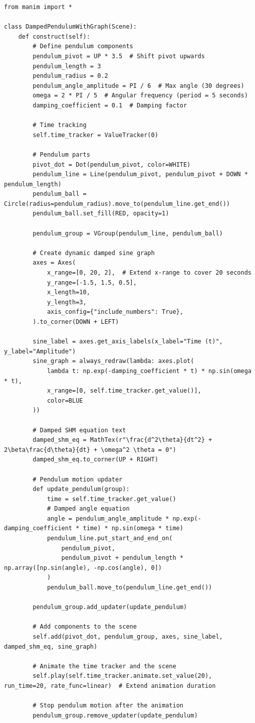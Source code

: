 \documentclass[12pt,a4paper]{article}
\begin{document}
\begin{verbatim}  
from manim import *

class DampedPendulumWithGraph(Scene):
    def construct(self):
        # Define pendulum components
        pendulum_pivot = UP * 3.5  # Shift pivot upwards
        pendulum_length = 3
        pendulum_radius = 0.2
        pendulum_angle_amplitude = PI / 6  # Max angle (30 degrees)
        omega = 2 * PI / 5  # Angular frequency (period = 5 seconds)
        damping_coefficient = 0.1  # Damping factor

        # Time tracking
        self.time_tracker = ValueTracker(0)

        # Pendulum parts
        pivot_dot = Dot(pendulum_pivot, color=WHITE)
        pendulum_line = Line(pendulum_pivot, pendulum_pivot + DOWN * pendulum_length)
        pendulum_ball = Circle(radius=pendulum_radius).move_to(pendulum_line.get_end())
        pendulum_ball.set_fill(RED, opacity=1)

        pendulum_group = VGroup(pendulum_line, pendulum_ball)

        # Create dynamic damped sine graph
        axes = Axes(
            x_range=[0, 20, 2],  # Extend x-range to cover 20 seconds
            y_range=[-1.5, 1.5, 0.5],
            x_length=10,
            y_length=3,
            axis_config={"include_numbers": True},
        ).to_corner(DOWN + LEFT)

        sine_label = axes.get_axis_labels(x_label="Time (t)", y_label="Amplitude")
        sine_graph = always_redraw(lambda: axes.plot(
            lambda t: np.exp(-damping_coefficient * t) * np.sin(omega * t),
            x_range=[0, self.time_tracker.get_value()],
            color=BLUE
        ))

        # Damped SHM equation text
        damped_shm_eq = MathTex(r"\frac{d^2\theta}{dt^2} + 2\beta\frac{d\theta}{dt} + \omega^2 \theta = 0")
        damped_shm_eq.to_corner(UP + RIGHT)

        # Pendulum motion updater
        def update_pendulum(group):
            time = self.time_tracker.get_value()
            # Damped angle equation
            angle = pendulum_angle_amplitude * np.exp(-damping_coefficient * time) * np.sin(omega * time)
            pendulum_line.put_start_and_end_on(
                pendulum_pivot,
                pendulum_pivot + pendulum_length * np.array([np.sin(angle), -np.cos(angle), 0])
            )
            pendulum_ball.move_to(pendulum_line.get_end())

        pendulum_group.add_updater(update_pendulum)

        # Add components to the scene
        self.add(pivot_dot, pendulum_group, axes, sine_label, damped_shm_eq, sine_graph)

        # Animate the time tracker and the scene
        self.play(self.time_tracker.animate.set_value(20), run_time=20, rate_func=linear)  # Extend animation duration

        # Stop pendulum motion after the animation
        pendulum_group.remove_updater(update_pendulum)

\end{verbatim}
\end{document}
